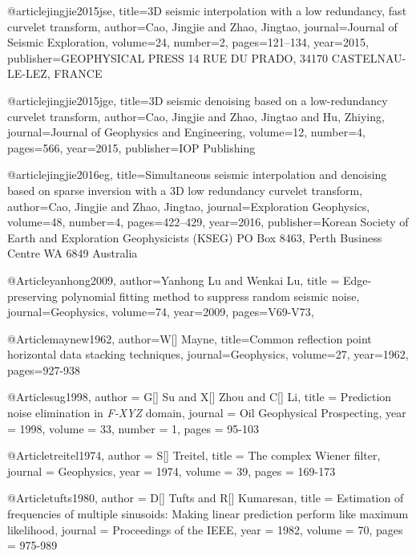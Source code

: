 @article{jingjie2015jse,
  title={3{D} seismic interpolation with a low redundancy, fast curvelet transform},
  author={Cao, Jingjie and Zhao, Jingtao},
  journal={Journal of Seismic Exploration},
  volume={24},
  number={2},
  pages={121--134},
  year={2015},
  publisher={GEOPHYSICAL PRESS 14 RUE DU PRADO, 34170 CASTELNAU-LE-LEZ, FRANCE}
}

@article{jingjie2015jge,
  title={3{D} seismic denoising based on a low-redundancy curvelet transform},
  author={Cao, Jingjie and Zhao, Jingtao and Hu, Zhiying},
  journal={Journal of Geophysics and Engineering},
  volume={12},
  number={4},
  pages={566},
  year={2015},
  publisher={IOP Publishing}
}

@article{jingjie2016eg,
  title={Simultaneous seismic interpolation and denoising based on sparse inversion with a 3{D} low redundancy curvelet transform},
  author={Cao, Jingjie and Zhao, Jingtao},
  journal={Exploration Geophysics},
  volume={48},
  number={4},
  pages={422--429},
  year={2016},
  publisher={Korean Society of Earth and Exploration Geophysicists (KSEG) PO Box 8463, Perth Business Centre WA 6849 Australia}
}













@Article{yanhong2009,
  author={Yanhong Lu and Wenkai Lu},
  title ={ Edge-preserving polynomial fitting method to suppress random seismic noise},
  journal={Geophysics},
  volume=74,
  year=2009,
  pages={V69-V73},
}

@Article{maynew1962,
author={W[] Mayne},
title={Common reflection point horizontal data stacking techniques},
journal={Geophysics},
volume=27,
year=1962,
pages={927-938}
}

@Article{sug1998,
  author = 	 {G[] Su and X[] Zhou and C[] Li},
  title = 	 { Prediction noise elimination in \emph{F-XYZ} domain},
  journal = 	 { Oil Geophysical Prospecting},
  year = 	 1998,
  volume = 	 33,
  number = 	 1,
  pages = 	 {95-103}}

@Article{treitel1974,
  author = 	 {S[] Treitel},
  title = 	 {The complex Wiener filter},
  journal = 	 { Geophysics},
  year = 	 1974,
  volume = 	 39,
  pages = 	 {169-173}}

@Article{tufts1980,
  author = 	 {D[] Tufts and R[] Kumaresan},
  title = 	 {Estimation of frequencies of multiple sinusoids: Making linear prediction perform like maximum likelihood},
  journal = 	 { Proceedings of the IEEE},
  year = 	 1982,
  volume = 	 70,
  pages = 	 {975-989}}

